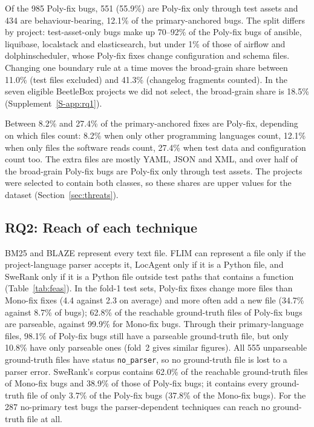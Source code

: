 \documentclass[a4paper,fleqn]{cas-dc}
\newcommand{\poly}{Poly-fix\xspace}
\begin{document}
Of the 985 Poly-fix bugs, 551 (55.9\%) are Poly-fix only through test assets
and 434 are behaviour-bearing, 12.1\% of the primary-anchored bugs. The split
differs by project: test-asset-only bugs make up 70--92\% of the Poly-fix bugs
of ansible, liquibase, localstack and elasticsearch, but under 1\% of those of
airflow and dolphinscheduler, whose Poly-fix fixes change configuration and
schema files. Changing one boundary rule at a time moves the broad-grain
share between 11.0\% (test files excluded) and 41.3\% (changelog fragments
counted). In the seven eligible BeetleBox projects we did not select, the
broad-grain share is 18.5\% (Supplement~\ref{S-app:rq1}).

\begin{tcolorbox}[title=Answer to RQ1]
Between 8.2\% and 27.4\% of the primary-anchored fixes are \poly, depending on
which files count: 8.2\% when only other programming languages count, 12.1\%
when only files the software reads count, 27.4\% when test data and
configuration count too. The extra files are mostly YAML, JSON and XML, and
over half of the broad-grain \poly bugs are \poly only through test assets.
The projects were selected to contain both classes, so these shares are
upper values for the dataset (Section~\ref{sec:threats}).
\end{tcolorbox}

\subsection{RQ2: Reach of each technique}\label{sec:rq2}

BM25 and BLAZE represent every text file. FLIM can represent a file only if
the project-language parser accepts it, LocAgent only if it is a Python file,
and SweRank only if it is a Python file outside test paths that contains a
function (Table~\ref{tab:feas}). In the fold-1 test sets, Poly-fix fixes
change more files than Mono-fix fixes (4.4 against 2.3 on average) and more
often add a new file (34.7\% against 8.7\% of bugs); 62.8\% of the reachable
ground-truth files of Poly-fix bugs are parseable, against 99.9\% for Mono-fix
bugs. Through their primary-language files, 98.1\% of Poly-fix bugs still
have a parseable ground-truth file, but only 10.8\% have only parseable ones
(fold~2 gives similar figures). All 555 unparseable ground-truth files have
status \texttt{no\_parser}, so no ground-truth file is lost to a parser error. SweRank's
corpus contains 62.0\% of the reachable ground-truth files of Mono-fix bugs and
38.9\% of those of Poly-fix bugs; it contains every ground-truth file of only
3.7\% of the Poly-fix bugs (37.8\% of the Mono-fix bugs). For the 287
no-primary test bugs the parser-dependent techniques can reach no ground-truth
file at all.
\end{document}
